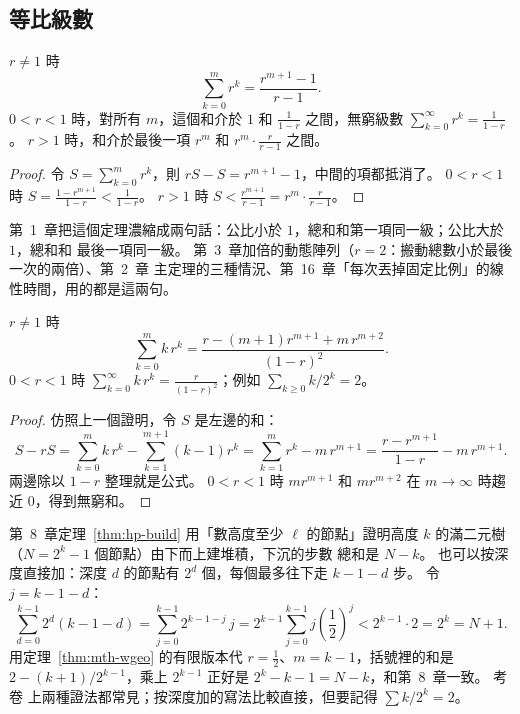 \subsection{等比級數}

\begin{theorem}
\label{thm:mth-geo}
$r \ne 1$ 時
\[
\sum_{k=0}^{m} r^k = \frac{r^{m+1} - 1}{r - 1}.
\]
$0 < r < 1$ 時，對所有 $m$，這個和介於 $1$ 和 $\frac{1}{1 - r}$ 之間，無窮級數
$\sum_{k=0}^{\infty} r^k = \frac{1}{1-r}$。 $r > 1$ 時，和介於最後一項 $r^m$ 和
$r^m \cdot \frac{r}{r - 1}$ 之間。
\end{theorem}

\begin{proof}
令 $S = \sum_{k=0}^{m} r^k$，則 $rS - S = r^{m+1} - 1$，中間的項都抵消了。 $0 < r < 1$ 時
$S = \frac{1 - r^{m+1}}{1 - r} < \frac{1}{1-r}$。 $r > 1$ 時
$S < \frac{r^{m+1}}{r - 1} = r^m \cdot \frac{r}{r-1}$。
\end{proof}

第~1~章把這個定理濃縮成兩句話：公比小於 $1$，總和和第一項同一級；公比大於 $1$，總和和
最後一項同一級。 第~3~章加倍的動態陣列（$r = 2$：搬動總數小於最後一次的兩倍）、第~2~章
主定理的三種情況、第~16~章「每次丟掉固定比例」的線性時間，用的都是這兩句。

\begin{theorem}
\label{thm:mth-wgeo}
$r \ne 1$ 時
\[
\sum_{k=0}^{m} k\, r^k = \frac{r - (m+1) r^{m+1} + m\, r^{m+2}}{(1 - r)^2}.
\]
$0 < r < 1$ 時 $\sum_{k=0}^{\infty} k\, r^k = \frac{r}{(1-r)^2}$；例如
$\sum_{k \ge 0} k / 2^k = 2$。
\end{theorem}

\begin{proof}
仿照上一個證明，令 $S$ 是左邊的和：
\[
S - rS = \sum_{k=0}^{m} k\, r^k - \sum_{k=1}^{m+1} (k - 1) r^k
= \sum_{k=1}^{m} r^k - m\, r^{m+1}
= \frac{r - r^{m+1}}{1 - r} - m\, r^{m+1}.
\]
兩邊除以 $1 - r$ 整理就是公式。 $0 < r < 1$ 時 $m r^{m+1}$ 和 $m r^{m+2}$ 在 $m \to \infty$
時趨近 $0$，得到無窮和。
\end{proof}

第~8~章定理~\ref{thm:hp-build} 用「數高度至少
$\ell$ 的節點」證明高度 $k$ 的滿二元樹（$N = 2^k - 1$ 個節點）由下而上建堆積，下沉的步數
總和是 $N - k$。 也可以按深度直接加：深度 $d$ 的節點有 $2^d$ 個，每個最多往下走
$k - 1 - d$ 步。 令 $j = k - 1 - d$：
\[
\sum_{d=0}^{k-1} 2^d (k - 1 - d) = \sum_{j=0}^{k-1} 2^{k-1-j}\, j
= 2^{k-1} \sum_{j=0}^{k-1} j \left(\frac{1}{2}\right)^j
< 2^{k-1} \cdot 2 = 2^k = N + 1 .
\]
用定理~\ref{thm:mth-wgeo} 的有限版本代 $r = \frac12$、$m = k - 1$，括號裡的和是
$2 - (k+1)/2^{k-1}$，乘上 $2^{k-1}$ 正好是 $2^k - k - 1 = N - k$，和第~8~章一致。 考卷
上兩種證法都常見；按深度加的寫法比較直接，但要記得 $\sum k / 2^k = 2$。

